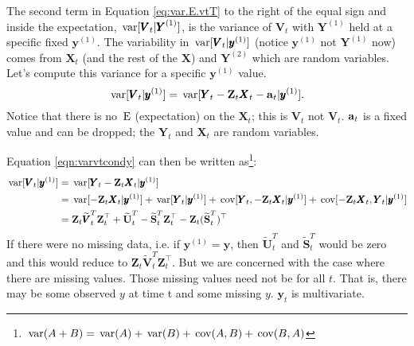 \documentclass[]{article}
\def\XI{\mbox{\boldmath $\Xi$}}
\def\E{\,\textup{\textrm{E}}}
\def\Ss{\mbox{$\mathbf S$}}
\def\UU{\mbox{$\mathbf U$}}	\def\uu{\mbox{$\mathbf u$}}
\def\VV{\mbox{$\pmb{V}$}}	\def\vv{\mbox{$\pmb{v}$}}
\def\XX{\mbox{$\pmb{X}$}}	\def\xx{\mbox{$\pmb{x}$}}
\def\YY{\mbox{$\pmb{Y}$}}	\def\yy{\mbox{$\pmb{y}$}}
\def\ZZ{\mbox{$\mathbf Z$}}	\def\zz{\mbox{$\mathbf z$}}	\def\Zb{\mbox{$\mathbf M$}} \def\Za{\mbox{$\mathbf N$}} \def\Zm{\XI}
\def\var{\,\textup{\textrm{var}}}
\def\cov{\,\textup{\textrm{cov}}}
\def\hatVt{\widetilde{\VV}_t^T}
\def\hatUt{\widetilde{\UU}_t^T}
\def\hatSt{\widetilde{\Ss}_t^T}
\begin{document}
The second term in Equation \ref{eq:var.E.vtT} to the right of the equal sign and inside the expectation, $\var[\VV_t|\YY^{(1)}]$, is the variance of $\VV_t$ with $\YY^{(1)}$ held at a specific fixed $\yy^{(1)}$. The variability in $\var[\VV_t|\yy^{(1)}]$ (notice $\yy^{(1)}$ not $\YY^{(1)}$ now) comes from $\XX_t$ (and the rest of the $\XX$) and $\YY^{(2)}$ which are random variables. Let's compute this variance for a specific $\yy^{(1)}$ value.
\begin{equation}\label{eqn:varvtcondy}
\var[\VV_t|\yy^{(1)}] = \var[ \YY_t - \ZZ_t\XX_t-\aa_t | \yy^{(1)} ].
\end{equation}
Notice that there is no $\E$ (expectation) on the $\XX_t$; this is $\VV_t$ not $\hat{\VV}_t$. $\aa_t$ is a fixed value and can be dropped; the $\YY_t$ and $\XX_t$ are random variables.

Equation \ref{eqn:varvtcondy} can then be written as\footnote{$\var(A+B)=\var(A)+\var(B)+\cov(A,B)+\cov(B,A)$}:
\begin{equation}\label{eq:var.Vt.yy}
\begin{split}
\var[\VV_t|\yy^{(1)}] &= \var[ \YY_t - \ZZ_t\XX_t | \yy^{(1)} ]\\
&=\var[ - \ZZ_t\XX_t | \yy^{(1)} ] + \var[ \YY_t|\yy^{(1)}] + \cov[ \YY_t, - \ZZ_t\XX_t | \yy^{(1)} ] + \cov[ - \ZZ_t\XX_t, \YY_t | \yy^{(1)} ]\\
&=\ZZ_t \hatVt \ZZ_t^\top + \hatUt - \hatSt\ZZ_t^\top - \ZZ_t(\hatSt)^\top
\end{split}
\end{equation}
If there were no missing data, i.e. if $\yy^{(1)}=\yy$, then $\hatUt$ and $\hatSt$ would be zero and this would reduce to $\ZZ_t \hatVt \ZZ_t^\top$. But we are concerned with the case where there are missing values. Those missing values need not be for all $t$. That is, there may be some observed $y$ at time t and some missing $y$. $\yy_t$ is multivariate.
\end{document}
